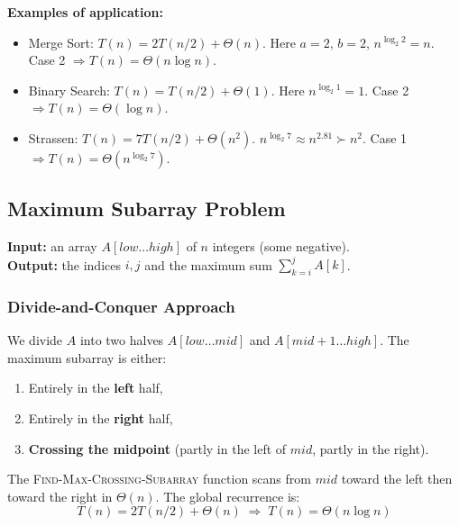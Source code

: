\textbf{Examples of application:}
\begin{itemize}
  \item Merge Sort: $T(n) = 2T(n/2) + \Theta(n)$.
        Here $a=2$, $b=2$, $n^{\log_2 2} = n$. Case 2 $\Rightarrow T(n)=\Theta(n\log n)$.
  \item Binary Search: $T(n) = T(n/2) + \Theta(1)$.
        Here $n^{\log_2 1} = 1$. Case 2 $\Rightarrow T(n)=\Theta(\log n)$.
  \item Strassen: $T(n) = 7T(n/2) + \Theta(n^2)$.
        $n^{\log_2 7} \approx n^{2.81} \succ n^2$. Case 1 $\Rightarrow T(n)=\Theta(n^{\log_2 7})$.
\end{itemize}

\subsection{Maximum Subarray Problem}

\textbf{Input:} an array $A[low \ldots high]$ of $n$ integers (some negative).\\
\textbf{Output:} the indices $i, j$ and the maximum sum $\sum_{k=i}^{j} A[k]$.

\subsubsection{Divide-and-Conquer Approach}

We divide $A$ into two halves $A[low \ldots mid]$ and $A[mid{+}1 \ldots high]$.
The maximum subarray is either:

\begin{enumerate}
  \item Entirely in the \textbf{left} half,
  \item Entirely in the \textbf{right} half,
  \item \textbf{Crossing the midpoint} (partly in the left of $mid$, partly in the right).
\end{enumerate}

\begin{center}
\end{center}

The \textsc{Find-Max-Crossing-Subarray} function scans from $mid$ toward the left then
toward the right in $\Theta(n)$. The global recurrence is:
\[
  T(n) = 2T(n/2) + \Theta(n) \;\Rightarrow\; \boxed{T(n) = \Theta(n \log n)}
\]